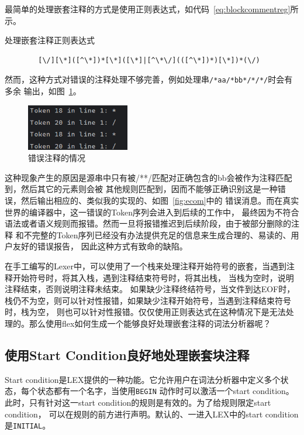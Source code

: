 \documentclass[a4paper,twoside]{article}
\begin{document}
\begin{spacing}{1.2}
最简单的处理嵌套注释的方式是使用正则表达式，如代码~\ref{eq:blockcommentreg}所示。
\begin{listing}[htb]
	\caption{处理嵌套注释正则表达式}
	\label{code:blockcommentreg}
	\begin{verbatim}
		[\/][\*]([^\*])*[\*]([\*]|[^\*\/](([^\*])*)[\*])*(\/)
	\end{verbatim}
\end{listing}
然而，这种方式对错误的注释处理不够完善，例如处理串\texttt{/*aa/*bb*/*/*/}时会有多余
输出，如图~\ref{fig:errreg}。
\begin{figure}[htb]
	\centering
	\caption{错误注释的情况}
	\label{fig:errreg}
	\includegraphics[width=0.4\textwidth]{images/errreg.png}
\end{figure}

这种现象产生的原因是源串中只有被/**/匹配对正确包含的bb会被作为注释匹配到，然后其它的元素则会被
其他规则匹配到，因而不能够正确识别这是一种错误，然后输出相应的、类似我的实现的、如图~\ref{fig:ecom}中的
错误消息。而在真实世界的编译器中，这一错误的Token序列会进入到后续的工作中，
最终因为不符合语法或者语义规则而报错。然而一旦将报错推迟到后续阶段，由于被部分删除的注释
和不完整的Token序列已经没有办法提供充足的信息来生成合理的、易读的、用户友好的错误报告，
因此这种方式有致命的缺陷。

在手工编写的Lexer中，可以使用了一个栈来处理注释开始符号的嵌套，当遇到注释开始符号时，将其入栈，遇到注释结束符号时，将其出栈，
当栈为空时，说明注释结束，否则说明注释未结束。
如果缺少注释终结符号，当文件到达EOF时，栈仍不为空，则可以针对性报错，如果缺少注释开始符号，当遇到注释结束符号时，栈为空，
则也可以针对性报错。仅仅使用正则表达式在这种情况下是无法处理的。那么使用flex如何生成一个能够良好处理嵌套注释的词法分析器呢？

\subsection{使用Start Condition良好地处理嵌套块注释}

Start condition是LEX提供的一种功能。它允许用户在词法分析器中定义多个状态，每个状态都有一个名字，当使用\texttt{BEGIN}
动作时可以激活一个start condition。此时，只有针对这一start condition的规则是有效的。为了给规则限定start condition，
可以在规则的前方进行声明。默认的、一进入LEX中的start condition是\texttt{INITIAL}。


\end{spacing}
\end{document}
